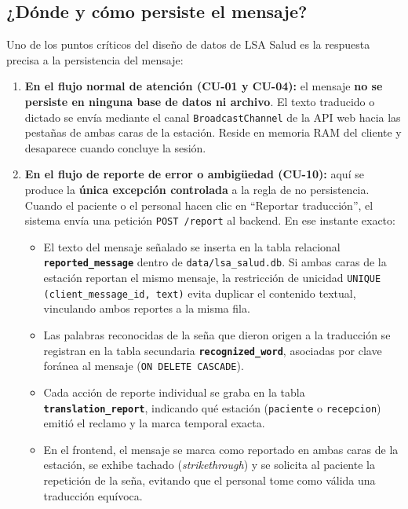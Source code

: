 \subsection{¿Dónde y cómo persiste el mensaje?}
\label{sec:dat-donde-persiste}

Uno de los puntos críticos del diseño de datos de LSA Salud es la respuesta
precisa a la persistencia del mensaje:

\begin{enumerate}[leftmargin=*]
    \item \textbf{En el flujo normal de atención (CU-01 y CU-04):} el mensaje
    \textbf{no se persiste en ninguna base de datos ni archivo}. El texto
    traducido o dictado se envía mediante el canal \texttt{BroadcastChannel}
    de la API web hacia las pestañas de ambas caras de la estación. Reside
    en memoria RAM del cliente y desaparece cuando concluye la sesión.
    
    \item \textbf{En el flujo de reporte de error o ambigüedad (CU-10):} aquí se
    produce la \textbf{única excepción controlada} a la regla de no
    persistencia. Cuando el paciente o el personal hacen clic en ``Reportar
    traducción'', el sistema envía una petición \texttt{POST /report} al backend.
    En ese instante exacto:
    \begin{itemize}[leftmargin=*, itemsep=2pt]
        \item El texto del mensaje señalado se inserta en la tabla relacional
        \textbf{\texttt{reported\_message}} dentro de \texttt{data/lsa\_salud.db}.
        Si ambas caras de la estación reportan el mismo mensaje, la restricción
        de unicidad \texttt{UNIQUE (client\_message\_id, text)} evita
        duplicar el contenido textual, vinculando ambos reportes a la misma fila.
        \item Las palabras reconocidas de la seña que dieron origen a la
        traducción se registran en la tabla secundaria
        \textbf{\texttt{recognized\_word}}, asociadas por clave foránea al
        mensaje (\texttt{ON DELETE CASCADE}).
        \item Cada acción de reporte individual se graba en la tabla
        \textbf{\texttt{translation\_report}}, indicando qué estación
        (\texttt{paciente} o \texttt{recepcion}) emitió el reclamo y la marca
        temporal exacta.
        \item En el frontend, el mensaje se marca como reportado en ambas caras
        de la estación, se exhibe tachado (\textit{strikethrough}) y se
        solicita al paciente la repetición de la seña, evitando que el
        personal tome como válida una traducción equívoca.
    \end{itemize}
\end{enumerate}

